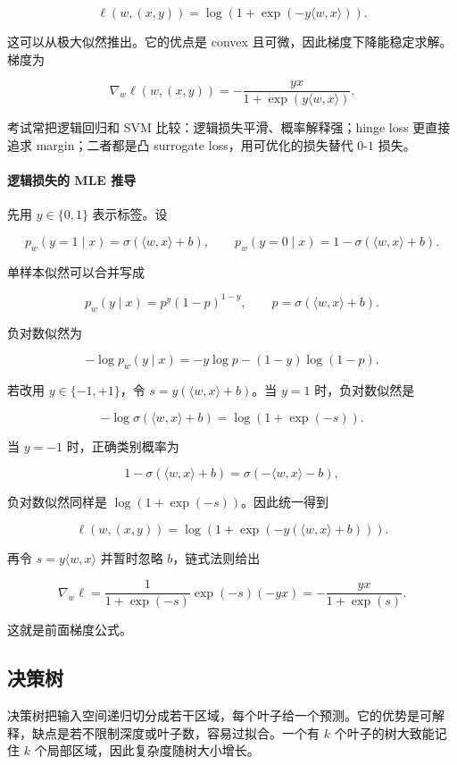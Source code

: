 \[
  \ell(w,(x,y))
  =
  \log\left(1+\exp(-y\langle w,x\rangle)\right).
\]

这可以从极大似然推出。它的优点是 convex 且可微，因此梯度下降能稳定求解。梯度为

\[
  \nabla_w\ell(w,(x,y))
  =
  -\frac{y x}{1+\exp(y\langle w,x\rangle)}.
\]

考试常把逻辑回归和 SVM 比较：逻辑损失平滑、概率解释强；hinge loss 更直接追求 margin；二者都是凸 surrogate loss，用可优化的损失替代 \(0\)-\(1\) 损失。

\paragraph{逻辑损失的 MLE 推导}

先用 \(y\in\{0,1\}\) 表示标签。设

\[
  p_w(y=1\mid x)=\sigma(\langle w,x\rangle+b),
  \qquad
  p_w(y=0\mid x)=1-\sigma(\langle w,x\rangle+b).
\]

单样本似然可以合并写成

\[
  p_w(y\mid x)
  =
  p^y(1-p)^{1-y},
  \qquad
  p=\sigma(\langle w,x\rangle+b).
\]

负对数似然为

\[
  -\log p_w(y\mid x)
  =
  -y\log p-(1-y)\log(1-p).
\]

若改用 \(y\in\{-1,+1\}\)，令 \(s=y(\langle w,x\rangle+b)\)。当 \(y=1\) 时，负对数似然是

\[
  -\log\sigma(\langle w,x\rangle+b)
  =
  \log(1+\exp(-s)).
\]

当 \(y=-1\) 时，正确类别概率为

\[
  1-\sigma(\langle w,x\rangle+b)
  =
  \sigma(-\langle w,x\rangle-b),
\]

负对数似然同样是 \(\log(1+\exp(-s))\)。因此统一得到

\[
  \ell(w,(x,y))
  =
  \log(1+\exp(-y(\langle w,x\rangle+b))).
\]

再令 \(s=y\langle w,x\rangle\) 并暂时忽略 \(b\)，链式法则给出

\[
  \nabla_w \ell
  =
  \frac{1}{1+\exp(-s)}
  \exp(-s)(-y x)
  =
  -\frac{y x}{1+\exp(s)}.
\]

这就是前面梯度公式。

\subsection{决策树}

决策树把输入空间递归切分成若干区域，每个叶子给一个预测。它的优势是可解释，缺点是若不限制深度或叶子数，容易过拟合。一个有 \(k\) 个叶子的树大致能记住 \(k\) 个局部区域，因此复杂度随树大小增长。

